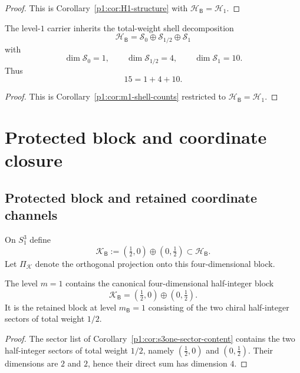 \documentclass[11pt]{article}
\begin{document}
\begin{proof}
This is Corollary~\ref{p1:cor:H1-structure} with \(\mathcal H_{\mathsf B}=\mathcal H_1\).
\end{proof}

\begin{corollary}
\label{p1:cor:s3one-shell-filtration}
The level-\(1\) carrier inherits the total-weight shell decomposition
\[
    \mathcal H_{\mathsf B}
    =
    \mathcal S_0\oplus\mathcal S_{1/2}\oplus\mathcal S_1
\]
with
\[
    \dim \mathcal S_0=1,
    \qquad
    \dim \mathcal S_{1/2}=4,
    \qquad
    \dim \mathcal S_1=10.
\]
Thus
\[
    15=1+4+10.
\]
\end{corollary}

\begin{proof}
This is Corollary~\ref{p1:cor:m1-shell-counts} restricted to \(\mathcal H_{\mathsf B}=\mathcal H_1\).
\end{proof}

\section{Protected block and coordinate closure}
\label{p1:sec:protected-block-coordinate-closure}

\subsection{Protected block and retained coordinate channels}

\begin{definition}
\label{p1:def:s3one-protected-block}
On \(S^3_1\) define
\[
    \mathcal K_{\mathsf B}
    :=
    (\tfrac12,0)\oplus(0,\tfrac12)
    \subset \mathcal H_{\mathsf B}.
\]
Let \(\Pi_{\mathcal K}\) denote the orthogonal projection onto this four-dimensional block.
\end{definition}

\begin{corollary}
\label{p1:cor:s3one-protected-block}
The level \(m=1\) contains the canonical four-dimensional half-integer block
\[
    \mathcal K_{\mathsf B}
    =
    (\tfrac12,0)\oplus(0,\tfrac12).
\]
It is the retained block at level \(m_{\mathsf B}=1\) consisting of the two chiral half-integer sectors of total weight \(1/2\).
\end{corollary}

\begin{proof}
The sector list of Corollary~\ref{p1:cor:s3one-sector-content} contains the two half-integer sectors of total weight \(1/2\), namely \((\tfrac12,0)\) and \((0,\tfrac12)\). Their dimensions are \(2\) and \(2\), hence their direct sum has dimension \(4\).
\end{proof}
\end{document}
